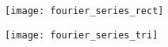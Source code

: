 \documentclass[landscape,columns=3]{cheatsheet} %
\begin{document}
\begin{minipage}{\columnwidth}
\texttt{[image: fourier\_series\_rect]}
\end{minipage}
%
%
\begin{minipage}{\columnwidth}
\texttt{[image: fourier\_series\_tri]}
\end{minipage}\\


\end{document}

